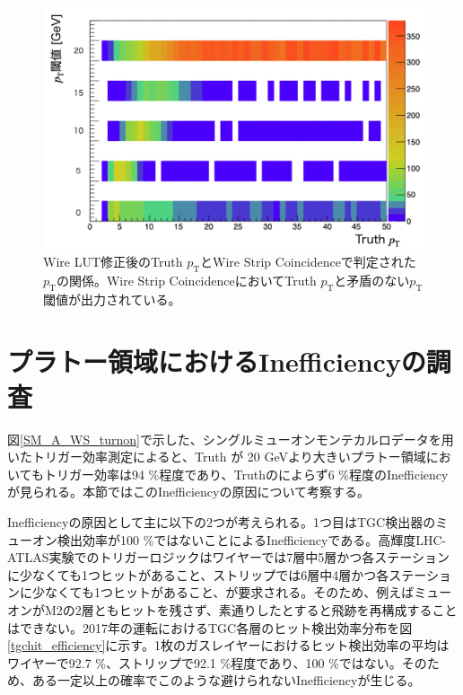 \begin{figure} 
\centering
\includegraphics[width=16cm]{fig/Test/pt_after.png}
\caption[]{Wire LUT修正後のTruth $p_\mathrm{T}$とWire Strip Coincidenceで判定された$p_\mathrm{T}$の関係。Wire Strip CoincidenceにおいてTruth $p_\mathrm{T}$と矛盾のない$p_\mathrm{T}$ 閾値が出力されている。}
\label{pt_after}
\end{figure}






\clearpage
\section{プラトー領域におけるInefficiencyの調査}
\label{sec:appendix:plateau}
図\ref{SM_A_WS_turnon}で示した、シングルミューオンモンテカルロデータを用いたトリガー効率測定によると、Truth \pt が 20 GeVより大きいプラトー領域においてもトリガー効率は94 \%程度であり、Truthの\pt によらず6 \%程度のInefficiencyが見られる。本節ではこのInefficiencyの原因について考察する。

Inefficiencyの原因として主に以下の2つが考えられる。1つ目はTGC検出器のミューオン検出効率が100 \%ではないことによるInefficiencyである。高輝度LHC-ATLAS実験でのトリガーロジックはワイヤーでは7層中5層かつ各ステーションに少なくても1つヒットがあること、ストリップでは6層中4層かつ各ステーションに少なくても1つヒットがあること、が要求される。そのため、例えばミューオンがM2の2層ともヒットを残さず、素通りしたとすると飛跡を再構成することはできない。2017年の運転におけるTGC各層のヒット検出効率分布を図\ref{tgchit_efficiency}に示す。1枚のガスレイヤーにおけるヒット検出効率の平均はワイヤーで92.7 \%、ストリップで92.1 \%程度であり、100 \%ではない。そのため、ある一定以上の確率でこのような避けられないInefficiencyが生じる。

